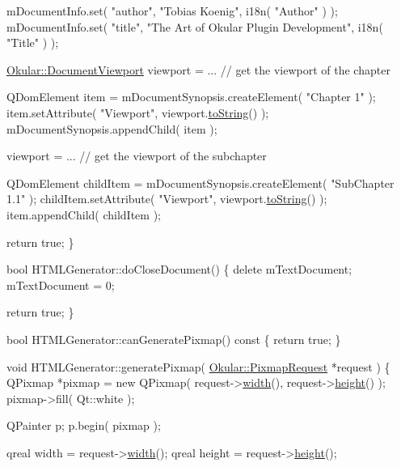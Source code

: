 \begin{DoxyCode}
    mDocumentInfo.set( \textcolor{stringliteral}{"author"}, \textcolor{stringliteral}{"Tobias Koenig"}, i18n( \textcolor{stringliteral}{"Author"} ) );
    mDocumentInfo.set( \textcolor{stringliteral}{"title"}, \textcolor{stringliteral}{"The Art of Okular Plugin Development"}, i18n( \textcolor{stringliteral}{"Title"} ) );

    \hyperlink{classOkular_1_1DocumentViewport}{Okular::DocumentViewport} viewport = ... \textcolor{comment}{// get the viewport of the chapter}

    QDomElement item = mDocumentSynopsis.createElement( \textcolor{stringliteral}{"Chapter 1"} );
    item.setAttribute( \textcolor{stringliteral}{"Viewport"}, viewport.\hyperlink{classOkular_1_1DocumentViewport_a77e42e0c9502b91085cd25f845ecafa0}{toString}() );
    mDocumentSynopsis.appendChild( item );

    viewport = ... \textcolor{comment}{// get the viewport of the subchapter}

    QDomElement childItem = mDocumentSynopsis.createElement( \textcolor{stringliteral}{"SubChapter 1.1"} );
    childItem.setAttribute( \textcolor{stringliteral}{"Viewport"}, viewport.\hyperlink{classOkular_1_1DocumentViewport_a77e42e0c9502b91085cd25f845ecafa0}{toString}() );
    item.appendChild( childItem );

    \textcolor{keywordflow}{return} \textcolor{keyword}{true};
\}

\textcolor{keywordtype}{bool} HTMLGenerator::doCloseDocument()
\{
    \textcolor{keyword}{delete} mTextDocument;
    mTextDocument = 0;

    \textcolor{keywordflow}{return} \textcolor{keyword}{true};
\}

\textcolor{keywordtype}{bool} HTMLGenerator::canGeneratePixmap()\textcolor{keyword}{ const}
\textcolor{keyword}{}\{
    \textcolor{keywordflow}{return} \textcolor{keyword}{true};
\}

\textcolor{keywordtype}{void} HTMLGenerator::generatePixmap( \hyperlink{classOkular_1_1PixmapRequest}{Okular::PixmapRequest} *request )
\{
    QPixmap *pixmap = \textcolor{keyword}{new} QPixmap( request->\hyperlink{classOkular_1_1PixmapRequest_a3e82f09b91a52efed7435eeb9903e5fc}{width}(), request->\hyperlink{classOkular_1_1PixmapRequest_a782392a2efc6303994c7e0158c76ee06}{height}() );
    pixmap->fill( Qt::white );

    QPainter p;
    p.begin( pixmap );

    qreal width = request->\hyperlink{classOkular_1_1PixmapRequest_a3e82f09b91a52efed7435eeb9903e5fc}{width}();
    qreal height = request->\hyperlink{classOkular_1_1PixmapRequest_a782392a2efc6303994c7e0158c76ee06}{height}();


\end{DoxyCode}
